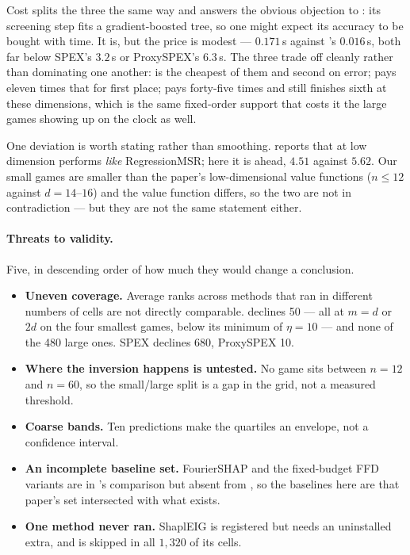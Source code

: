 Cost splits the three the same way and answers the obvious objection to \oddshap{}: its screening
step fits a gradient-boosted tree, so one might expect its accuracy to be bought with time. It is,
but the price is modest --- $0.171$\,s against \leverageshap{}'s $0.016$\,s, both far below SPEX's
$3.2$\,s or ProxySPEX's $6.3$\,s. The three trade off cleanly rather than dominating one another:
\leverageshap{} is the cheapest of them and second on error; \oddshap{} pays eleven times that for
first place; \polyshap{} pays forty-five times and still finishes sixth at these dimensions, which
is the same fixed-order support that costs it the large games showing up on the clock as well.

One deviation is worth stating rather than smoothing. \citet{Fumagalli.2026} reports that at low
dimension \oddshap{} performs \emph{like} RegressionMSR; here it is ahead, $4.51$ against $5.62$.
Our small games are smaller than the paper's low-dimensional value functions ($n \le 12$ against
$d = 14$–$16$) and the value function differs, so the two are not in contradiction --- but they are
not the same statement either.

\paragraph{Threats to validity.}
Five, in descending order of how much they would change a conclusion.

\begin{itemize}\setlength\itemsep{0.15em}
    \item \textbf{Uneven coverage.} Average ranks across methods that ran in different numbers of
        cells are not directly comparable. \oddshap{} declines 50 --- all at $m = d$ or $2d$ on the
        four smallest games, below its minimum of $\eta = 10$ --- and none of the 480 large ones.
        SPEX declines 680, ProxySPEX 10.
    \item \textbf{Where the inversion happens is untested.} No game sits between $n = 12$ and
        $n = 60$, so the small/large split is a gap in the grid, not a measured threshold.
    \item \textbf{Coarse bands.} Ten predictions make the quartiles an envelope, not a confidence
        interval.
    \item \textbf{An incomplete baseline set.} FourierSHAP and the fixed-budget FFD variants are in
        \citet{Fumagalli.2026}'s comparison but absent from \shapiq{}, so the baselines here are
        that paper's set intersected with what exists.
    \item \textbf{One method never ran.} ShaplEIG is registered but needs an uninstalled extra, and
        is skipped in all $1{,}320$ of its cells.
\end{itemize}
